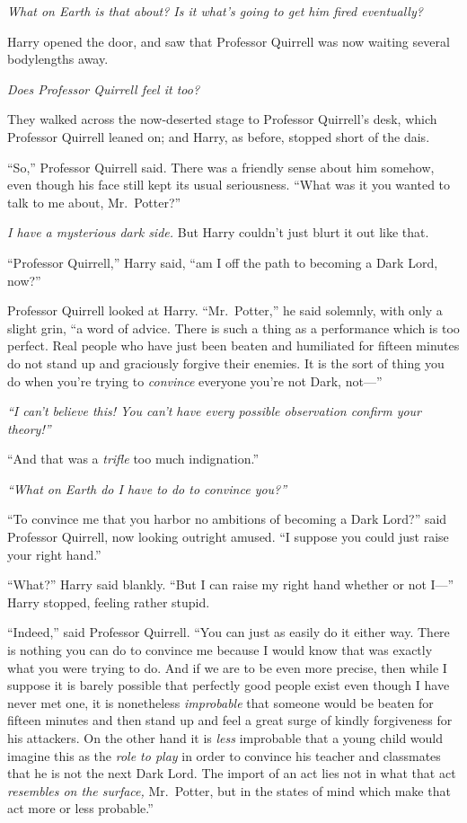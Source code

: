 \emph{What on Earth is that about? Is it what's going to get him fired
eventually?}

Harry opened the door, and saw that Professor Quirrell was now waiting
several bodylengths away.

\emph{Does Professor Quirrell feel it too?}

They walked across the now-deserted stage to Professor Quirrell's desk,
which Professor Quirrell leaned on; and Harry, as before, stopped short
of the dais.

``So,'' Professor Quirrell said. There was a friendly sense about him
somehow, even though his face still kept its usual seriousness. ``What
was it you wanted to talk to me about, Mr.~Potter?''

\emph{I have a mysterious dark side.} But Harry couldn't just blurt it
out like that.

``Professor Quirrell,'' Harry said, ``am I off the path to becoming a
Dark Lord, now?''

Professor Quirrell looked at Harry. ``Mr.~Potter,'' he said solemnly,
with only a slight grin, ``a word of advice. There is such a thing as a
performance which is too perfect. Real people who have just been beaten
and humiliated for fifteen minutes do not stand up and graciously
forgive their enemies. It is the sort of thing you do when you're trying
to \emph{convince} everyone you're not Dark, not---''

\emph{``I can't believe this! You can't have every possible observation
confirm your theory!''}

``And that was a \emph{trifle} too much indignation.''

\emph{``What on Earth do I have to do to convince you?''}

``To convince me that you harbor no ambitions of becoming a Dark Lord?''
said Professor Quirrell, now looking outright amused. ``I suppose you
could just raise your right hand.''

``What?'' Harry said blankly. ``But I can raise my right hand whether or
not I---'' Harry stopped, feeling rather stupid.

``Indeed,'' said Professor Quirrell. ``You can just as easily do it
either way. There is nothing you can do to convince me because I would
know that was exactly what you were trying to do. And if we are to be
even more precise, then while I suppose it is barely possible that
perfectly good people exist even though I have never met one, it is
nonetheless \emph{improbable} that someone would be beaten for fifteen
minutes and then stand up and feel a great surge of kindly forgiveness
for his attackers. On the other hand it is \emph{less} improbable that a
young child would imagine this as the \emph{role to play} in order to
convince his teacher and classmates that he is not the next Dark Lord.
The import of an act lies not in what that act \emph{resembles on the
surface,} Mr.~Potter, but in the states of mind which make that act more
or less probable.''

